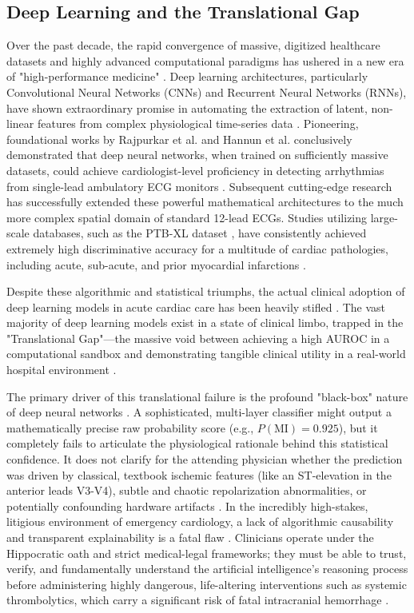 \documentclass[10pt,twocolumn,letterpaper]{article}
\begin{document}
\subsection{Deep Learning and the Translational Gap}
Over the past decade, the rapid convergence of massive, digitized healthcare datasets and highly advanced computational paradigms has ushered in a new era of "high-performance medicine" \cite{topol2019high}. Deep learning architectures, particularly Convolutional Neural Networks (CNNs) and Recurrent Neural Networks (RNNs), have shown extraordinary promise in automating the extraction of latent, non-linear features from complex physiological time-series data \cite{lecun2015deep}. Pioneering, foundational works by Rajpurkar et al. and Hannun et al. conclusively demonstrated that deep neural networks, when trained on sufficiently massive datasets, could achieve cardiologist-level proficiency in detecting arrhythmias from single-lead ambulatory ECG monitors \cite{rajpurkar2017cardiologist, hannun2019cardiologist}. Subsequent cutting-edge research has successfully extended these powerful mathematical architectures to the much more complex spatial domain of standard 12-lead ECGs. Studies utilizing large-scale databases, such as the PTB-XL dataset \cite{wagner2020ptb}, have consistently achieved extremely high discriminative accuracy for a multitude of cardiac pathologies, including acute, sub-acute, and prior myocardial infarctions \cite{strodthoff2020deep}.

Despite these algorithmic and statistical triumphs, the actual clinical adoption of deep learning models in acute cardiac care has been heavily stifled \cite{kelly2019key}. The vast majority of deep learning models exist in a state of clinical limbo, trapped in the "Translational Gap"—the massive void between achieving a high AUROC in a computational sandbox and demonstrating tangible clinical utility in a real-world hospital environment \cite{wiens2019no}. 

The primary driver of this translational failure is the profound "black-box" nature of deep neural networks \cite{amann2020explainability}. A sophisticated, multi-layer classifier might output a mathematically precise raw probability score (e.g., $P(\text{MI}) = 0.925$), but it completely fails to articulate the physiological rationale behind this statistical confidence. It does not clarify for the attending physician whether the prediction was driven by classical, textbook ischemic features (like an ST-elevation in the anterior leads V3-V4), subtle and chaotic repolarization abnormalities, or potentially confounding hardware artifacts \cite{holzinger2019causability}. In the incredibly high-stakes, litigious environment of emergency cardiology, a lack of algorithmic causability and transparent explainability is a fatal flaw \cite{ribeiro2016should}. Clinicians operate under the Hippocratic oath and strict medical-legal frameworks; they must be able to trust, verify, and fundamentally understand the artificial intelligence's reasoning process before administering highly dangerous, life-altering interventions such as systemic thrombolytics, which carry a significant risk of fatal intracranial hemorrhage \cite{challen2019artificial}.
\end{document}
